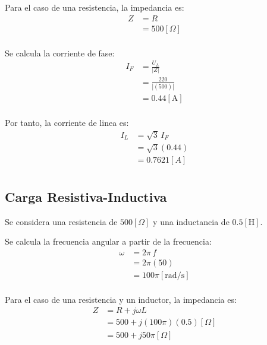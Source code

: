 \documentclass[letter,11pt]{article}
\begin{document}
Para el caso de una resistencia, la impedancia es:
\begin{equation*}
    \begin{split}
        Z&=R\\
         &=500[\Omega]\\
    \end{split}
\end{equation*}

Se calcula la corriente de fase:
\begin{equation*}
    \begin{split}
        I_F&=\frac{U_L}{|Z|}\\
           &=\frac{220}{|(500)|}\\
           &=0.44[\text{A}]\\
    \end{split}
\end{equation*}

Por tanto, la corriente de linea es:
\begin{equation*}
    \begin{split}
        I_L&=\sqrt{3}\,I_F\\
           &=\sqrt{3}(0.44)\\
           &=0.7621[A]\\
    \end{split}
\end{equation*}

\subsection{Carga Resistiva-Inductiva}
Se considera una resistencia de $500[\Omega]$ y una inductancia de
$0.5[\text{H}]$.

Se calcula la frecuencia angular a partir de la frecuencia:
\begin{equation*}
    \begin{split}
        \omega&=2\pi\,f\\
              &=2\pi(50)\\
              &=100\pi[\text{rad}/\text{s}]\\
    \end{split}
\end{equation*}

Para el caso de una resistencia y un inductor, la impedancia es:
\begin{equation*}
    \begin{split}
        Z&=R+j\omega L\\
         &=500+j(100\pi)(0.5)[\Omega]\\
         &=500+j50\pi[\Omega]\\
    \end{split}
\end{equation*}
\end{document}
